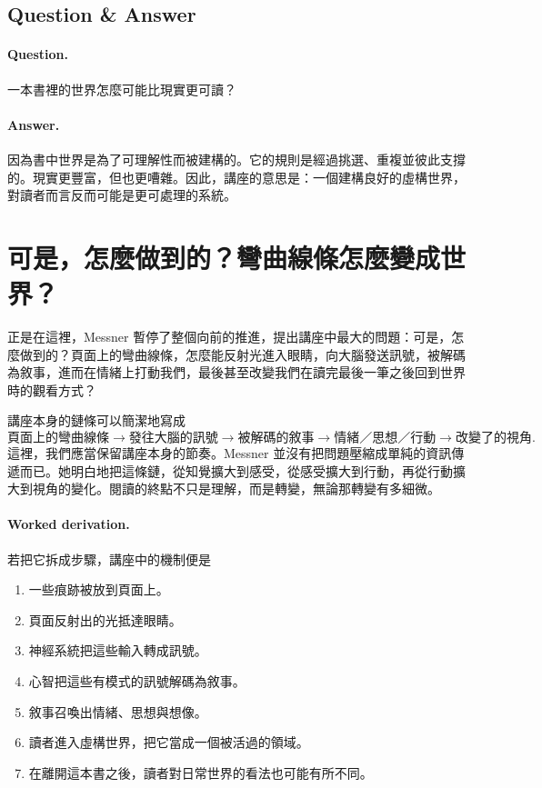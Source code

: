 \subsection{Question \& Answer}

\paragraph{Question.} 一本書裡的世界怎麼可能比現實更可讀？

\paragraph{Answer.} 因為書中世界是為了可理解性而被建構的。它的規則是經過挑選、重複並彼此支撐的。現實更豐富，但也更嘈雜。因此，講座的意思是：一個建構良好的虛構世界，對讀者而言反而可能是更可處理的系統。

\section{可是，怎麼做到的？彎曲線條怎麼變成世界？}

正是在這裡，Messner 暫停了整個向前的推進，提出講座中最大的問題：可是，怎麼做到的？頁面上的彎曲線條，怎麼能反射光進入眼睛，向大腦發送訊號，被解碼為敘事，進而在情緒上打動我們，最後甚至改變我們在讀完最後一筆之後回到世界時的觀看方式？

講座本身的鏈條可以簡潔地寫成
\begin{equation}
\text{頁面上的彎曲線條} \to \text{發往大腦的訊號} \to \text{被解碼的敘事} \to \text{情緒／思想／行動} \to \text{改變了的視角}.
\end{equation}
這裡，我們應當保留講座本身的節奏。Messner 並沒有把問題壓縮成單純的資訊傳遞而已。她明白地把這條鏈，從知覺擴大到感受，從感受擴大到行動，再從行動擴大到視角的變化。閱讀的終點不只是理解，而是轉變，無論那轉變有多細微。

\paragraph{Worked derivation.} 若把它拆成步驟，講座中的機制便是
\begin{enumerate}
\item 一些痕跡被放到頁面上。
\item 頁面反射出的光抵達眼睛。
\item 神經系統把這些輸入轉成訊號。
\item 心智把這些有模式的訊號解碼為敘事。
\item 敘事召喚出情緒、思想與想像。
\item 讀者進入虛構世界，把它當成一個被活過的領域。
\item 在離開這本書之後，讀者對日常世界的看法也可能有所不同。
\end{enumerate}


